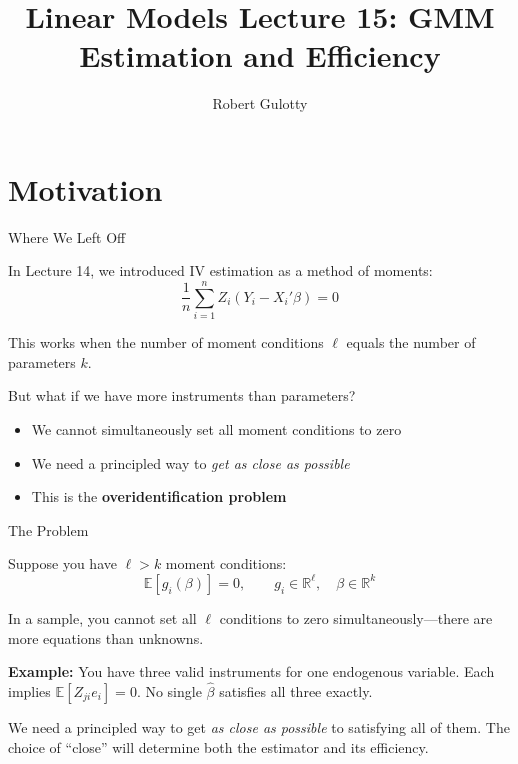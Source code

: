 \documentclass[aspectratio=169, handout, t]{beamer}
\title[PLSC 30700]{Linear Models Lecture 15: GMM Estimation and Efficiency}
\author{Robert Gulotty}
\institute[Chicago]{University of Chicago}
\numberwithin{equation}{section}
\begin{document}
\section{Motivation}

\begin{frame}
\titlepage
\end{frame}

\begin{frame}{Where We Left Off}

In Lecture 14, we introduced IV estimation as a \alert{method of moments}:
$$\frac{1}{n}\sum_{i=1}^n Z_i(Y_i - X_i'\beta) = 0$$

\medskip
This works when the number of moment conditions $\ell$ equals the number of parameters $k$.

\medskip
\alert{But what if we have more instruments than parameters?}

\begin{itemize}
\item We cannot simultaneously set all moment conditions to zero
\item We need a principled way to \textit{get as close as possible}
\item This is the \textbf{overidentification problem}
\end{itemize}

\end{frame}

\begin{frame}{The Problem}

Suppose you have $\ell > k$ moment conditions:
$$\mathbb{E}[g_i(\beta)] = 0, \qquad g_i \in \mathbb{R}^\ell, \quad \beta \in \mathbb{R}^k$$

\pause
In a sample, you cannot set all $\ell$ conditions to zero simultaneously---there are more equations than unknowns.

\pause
\medskip
\textbf{Example:} You have three valid instruments for one endogenous variable.  Each implies $\mathbb{E}[Z_{ji} e_i] = 0$.  No single $\hat\beta$ satisfies all three exactly.

\pause
\medskip
We need a principled way to get \emph{as close as possible} to satisfying all of them.  The choice of ``close'' will determine both the estimator and its efficiency.

\end{frame}
\end{document}
